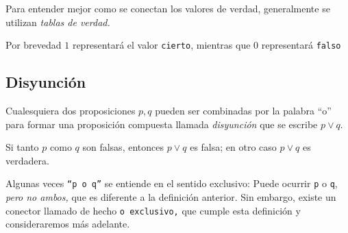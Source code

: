     \begin{observacion}
        Para entender mejor como se conectan los valores de verdad, generalmente se utilizan \emph{tablas de verdad.}  
        
        Por brevedad $1$ representará el valor \texttt{cierto}, mientras que $0$ representará \texttt{falso}
    \end{observacion}
    

\subsection{Disyunción}


    Cualesquiera dos proposiciones $p,q$ pueden ser combinadas por la palabra ``o'' para formar una proposición compuesta llamada \emph{disyunción} que se escribe $p \vee q .$



    \begin{definicion}
        Si tanto $p$ como $q$ son falsas, entonces $p \vee q$ es falsa; en otro caso $p\vee q$ es verdadera.
    \end{definicion}
 \begin{observacion}
  Algunas veces \texttt{``p o q''} se entiende en el sentido exclusivo: Puede ocurrir \texttt{p} o \texttt{q}, \emph{pero no ambos,} que es diferente a la definición anterior. Sin embargo, existe un conector llamado de hecho \texttt{o exclusivo,} que cumple esta definición y consideraremos más adelante. 
 \end{observacion}



